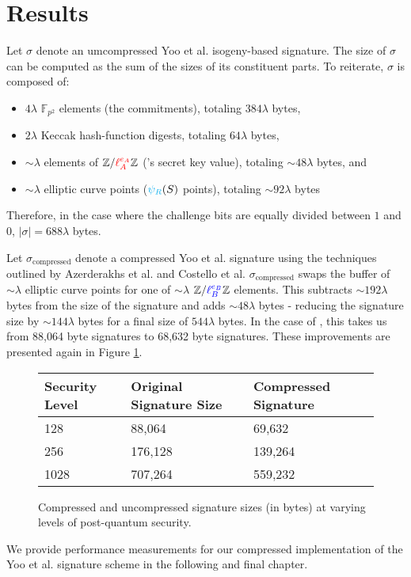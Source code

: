 \section{Results}

Let $\sigma$ denote an umcompressed Yoo et al. isogeny-based signature. The size of $\sigma$ can be computed as the sum of the sizes of its constituent parts. To reiterate, $\sigma$ is composed of:
\begin{itemize}
\item $4\lambda$ $\mathbb{F}_{p^2}$ elements (the commitments), totaling $384\lambda$ bytes,
\item $2\lambda$ Keccak hash-function digests, totaling $64\lambda$ bytes,
\item ${\sim}\lambda$ elements of $\mathbb{Z}/\textcolor{red}{\ell_{A}^{e_A}}\mathbb{Z}$ (\randall's secret key value), totaling ${\sim}48\lambda$ bytes, and
\item ${\sim}\lambda$ elliptic curve points ($\textcolor{cyan}{\psi_R}(S)$ points), totaling ${\sim}92\lambda$ bytes
\end{itemize}

Therefore, in the case where the challenge bits are equally divided between $1$ and $0$, $\vert \sigma \vert = 688\lambda$ bytes.

Let $\sigma_{\text{compressed}}$ denote a compressed Yoo et al. signature using the techniques outlined by Azerderakhs et al. and Costello et al. $\sigma_{\text{compressed}}$ swaps the buffer of ${\sim}\lambda$ elliptic curve points for one of ${\sim}\lambda$ $\mathbb{Z}/\textcolor{blue}{\ell_{B}^{e_B}}\mathbb{Z}$ elements. This subtracts ${\sim}192\lambda$ bytes from the size of the signature and adds ${\sim}48\lambda$ bytes - reducing the signature size by ${\sim}144\lambda$ bytes for a final size of $544\lambda$ bytes. In the case of \sidh, this takes us from 88,064 byte signatures to 68,632 byte signatures. These improvements are presented again in Figure \ref{fig:sigsizeresults}.\\

\begin{figure}[!h]
\begin{center}
\begin{tabular}{ | l | b | b | }
\hline
Security Level & Original Signature Size & Compressed Signature \\
\hline
128 & 88,064 & 69,632 \\
256 & 176,128 & 139,264 \\
1028 & 707,264 & 559,232 \\
\hline
\end{tabular}
\end{center}
\caption{Compressed and uncompressed signature sizes (in bytes) at varying levels of post-quantum security.}
\label{fig:sigsizeresults}
\end{figure}

\noindent
We provide performance measurements for our compressed implementation of the Yoo et al. signature scheme in the following and final chapter.
